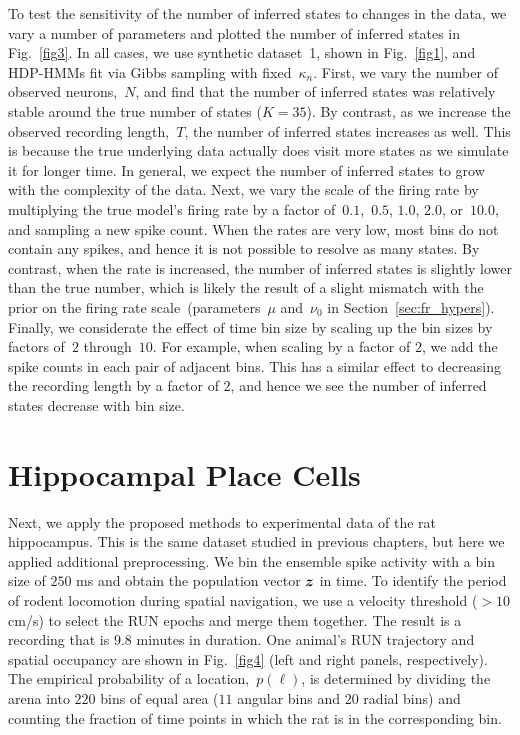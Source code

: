 To test the sensitivity of the number of inferred states to changes in
the data, we vary a number of parameters and plotted the number of
inferred states in Fig.~\ref{fig3}. In all cases, we use synthetic
dataset~1, shown in Fig.~\ref{fig1}, and HDP-HMMs fit via Gibbs
sampling with fixed~$\kappa_n$. First, we vary the number of
observed neurons,~$N$, and find that the number of inferred states was
relatively stable around the true number of states ($K=35$). By
contrast, as we increase the observed recording length,~$T$, the
number of inferred states increases as well. This is because the true
underlying data actually does visit more states as we simulate it for
longer time. In general, we expect the number of inferred states to
grow with the complexity of the data. Next, we vary the scale of the
firing rate by multiplying the true model's firing rate by a factor
of~$0.1$,~$0.5$, $1.0$, $2.0$, or~$10.0$, and sampling a new spike
count. When the rates are very low, most bins do not contain any
spikes, and hence it is not possible to resolve as many states. By
contrast, when the rate is increased, the number of inferred states is
slightly lower than the true number, which is likely the result of a
slight mismatch with the prior on the firing rate
scale~(parameters~$\mu$ and~$\nu_0$ in
Section~\ref{sec:fr_hypers}). Finally, we considerate the effect of
time bin size by scaling up the bin sizes by factors of~$2$
through~$10$. For example, when scaling by a factor of $2$, we add the
spike counts in each pair of adjacent bins. This has a similar effect
to decreasing the recording length by a factor of $2$, and hence we see
the number of inferred states decrease with bin size.

\section{Hippocampal Place Cells} 

Next, we apply the proposed methods to experimental data of the rat
hippocampus. This is the same dataset studied in previous chapters, but
here we applied additional preprocessing. We bin the ensemble spike activity
with a bin size of $250$ ms and obtain the population vector $\boldsymbol{z}$ in
time.  To identify the period of rodent locomotion during spatial
navigation, we use a velocity threshold ($>10$ cm/s) to select the RUN
epochs and merge them together.  The result is a recording that is 
$9.8$ minutes in duration. One animal's RUN trajectory and
spatial occupancy are shown in Fig.~\ref{fig4} (left and right panels,
respectively). The empirical probability of a location,~${p(\ell)}$,
is determined by dividing the arena into $220$ bins of equal area ($11$
angular bins and $20$ radial bins) and counting the fraction of time
points in which the rat is in the corresponding bin.

